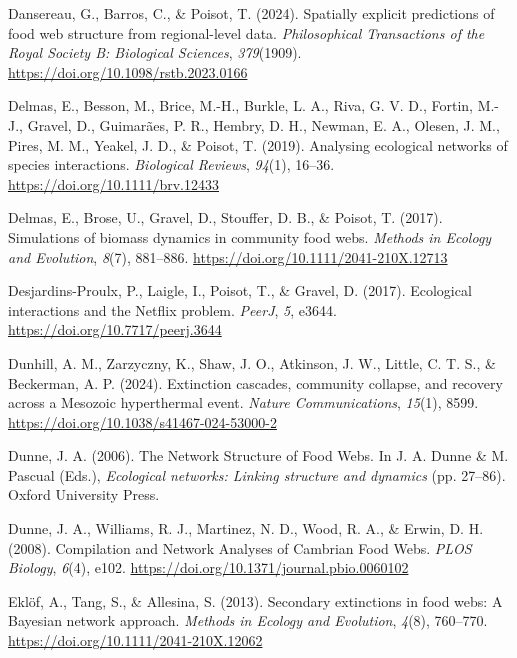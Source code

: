 \documentclass[
]{article}
\newlength{\cslhangindent}
\newenvironment{CSLReferences}[2] %
 {\begin{list}{}{%
  \setlength{\itemindent}{0pt}
  \setlength{\leftmargin}{0pt}
  \setlength{\parsep}{0pt}
  \ifodd #1
   \setlength{\leftmargin}{\cslhangindent}
   \setlength{\itemindent}{-1\cslhangindent}
  \fi
  \setlength{\itemsep}{#2\baselineskip}}}
 {\end{list}}
\begin{document}
\begin{CSLReferences}{1}{0}
Dansereau, G., Barros, C., \& Poisot, T. (2024). Spatially explicit
predictions of food web structure from regional-level data.
\emph{Philosophical Transactions of the Royal Society B: Biological
Sciences}, \emph{379}(1909).
\url{https://doi.org/10.1098/rstb.2023.0166}

Delmas, E., Besson, M., Brice, M.-H., Burkle, L. A., Riva, G. V. D.,
Fortin, M.-J., Gravel, D., Guimarães, P. R., Hembry, D. H., Newman, E.
A., Olesen, J. M., Pires, M. M., Yeakel, J. D., \& Poisot, T. (2019).
Analysing ecological networks of species interactions. \emph{Biological
Reviews}, \emph{94}(1), 16--36. \url{https://doi.org/10.1111/brv.12433}

Delmas, E., Brose, U., Gravel, D., Stouffer, D. B., \& Poisot, T.
(2017). Simulations of biomass dynamics in community food webs.
\emph{Methods in Ecology and Evolution}, \emph{8}(7), 881--886.
\url{https://doi.org/10.1111/2041-210X.12713}

Desjardins-Proulx, P., Laigle, I., Poisot, T., \& Gravel, D. (2017).
Ecological interactions and the {Netflix} problem. \emph{PeerJ},
\emph{5}, e3644. \url{https://doi.org/10.7717/peerj.3644}

Dunhill, A. M., Zarzyczny, K., Shaw, J. O., Atkinson, J. W., Little, C.
T. S., \& Beckerman, A. P. (2024). Extinction cascades, community
collapse, and recovery across a {Mesozoic} hyperthermal event.
\emph{Nature Communications}, \emph{15}(1), 8599.
\url{https://doi.org/10.1038/s41467-024-53000-2}

Dunne, J. A. (2006). The {Network Structure} of {Food Webs}. In J. A.
Dunne \& M. Pascual (Eds.), \emph{Ecological networks: {Linking}
structure and dynamics} (pp. 27--86). Oxford University Press.

Dunne, J. A., Williams, R. J., Martinez, N. D., Wood, R. A., \& Erwin,
D. H. (2008). Compilation and {Network Analyses} of {Cambrian Food
Webs}. \emph{PLOS Biology}, \emph{6}(4), e102.
\url{https://doi.org/10.1371/journal.pbio.0060102}

Eklöf, A., Tang, S., \& Allesina, S. (2013). Secondary extinctions in
food webs: A {Bayesian} network approach. \emph{Methods in Ecology and
Evolution}, \emph{4}(8), 760--770.
\url{https://doi.org/10.1111/2041-210X.12062}


\end{CSLReferences}
\end{document}
